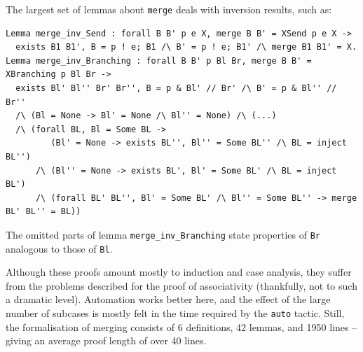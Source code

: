 \documentclass[runningheads]{llncs}
\begin{document}
The largest set of lemmas about \lstinline+merge+ deals with inversion
results, such as:
\begin{lstlisting}
Lemma merge_inv_Send : forall B B' p e X, merge B B' = XSend p e X ->
  exists B1 B1', B = p ! e; B1 /\ B' = p ! e; B1' /\ merge B1 B1' = X.
Lemma merge_inv_Branching : forall B B' p Bl Br, merge B B' = XBranching p Bl Br ->
  exists Bl' Bl'' Br' Br'', B = p & Bl' // Br' /\ B' = p & Bl'' // Br''
  /\ (Bl = None -> Bl' = None /\ Bl'' = None) /\ (...)
  /\ (forall BL, Bl = Some BL ->
         (Bl' = None -> exists BL'', Bl'' = Some BL'' /\ BL = inject BL'')
      /\ (Bl'' = None -> exists BL', Bl' = Some BL' /\ BL = inject BL')
      /\ (forall BL' BL'', Bl' = Some BL' /\ Bl'' = Some BL'' -> merge BL' BL'' = BL))
\end{lstlisting}
The omitted parts of lemma \lstinline+merge_inv_Branching+ state properties of \lstinline+Br+ analogous to those of \lstinline+Bl+.

Although these proofs amount mostly to induction and case analysis, they suffer from the problems
described for the proof of associativity (thankfully, not to such a dramatic level).
Automation works better here, and the effect of the large number of
subcases is mostly felt in the time required by the \lstinline+auto+ tactic.
Still, the formalisation of merging consists of 6 definitions, 42 lemmas, and 1950 lines %
-- giving an average proof length of over 40 lines.
\end{document}
